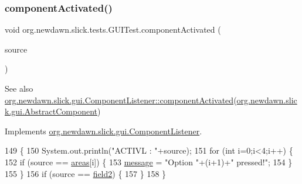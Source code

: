 \subsubsection{\texorpdfstring{component\+Activated()}{componentActivated()}}
{\footnotesize\ttfamily void org.\+newdawn.\+slick.\+tests.\+G\+U\+I\+Test.\+component\+Activated (\begin{DoxyParamCaption}\item[{\mbox{\hyperlink{classorg_1_1newdawn_1_1slick_1_1gui_1_1_abstract_component}{Abstract\+Component}}}]{source }\end{DoxyParamCaption})\hspace{0.3cm}{\ttfamily [inline]}}

\begin{DoxySeeAlso}{See also}
\mbox{\hyperlink{interfaceorg_1_1newdawn_1_1slick_1_1gui_1_1_component_listener_a078740e03974ce07a757744a771e8626}{org.\+newdawn.\+slick.\+gui.\+Component\+Listener\+::component\+Activated}}(\mbox{\hyperlink{classorg_1_1newdawn_1_1slick_1_1gui_1_1_abstract_component}{org.\+newdawn.\+slick.\+gui.\+Abstract\+Component}}) 
\end{DoxySeeAlso}


Implements \mbox{\hyperlink{interfaceorg_1_1newdawn_1_1slick_1_1gui_1_1_component_listener_a078740e03974ce07a757744a771e8626}{org.\+newdawn.\+slick.\+gui.\+Component\+Listener}}.


\begin{DoxyCode}
149                                                              \{
150         System.out.println(\textcolor{stringliteral}{"ACTIVL : "}+source);
151         \textcolor{keywordflow}{for} (\textcolor{keywordtype}{int} i=0;i<4;i++) \{
152             \textcolor{keywordflow}{if} (source == \mbox{\hyperlink{classorg_1_1newdawn_1_1slick_1_1tests_1_1_g_u_i_test_a45e7638907d2d4662aca08ffa006a326}{areas}}[i]) \{
153                 \mbox{\hyperlink{classorg_1_1newdawn_1_1slick_1_1tests_1_1_g_u_i_test_abd20571a152e1beddc3e70a5c3e348a6}{message}} = \textcolor{stringliteral}{"Option "}+(i+1)+\textcolor{stringliteral}{" pressed!"};
154             \}
155         \}
156         \textcolor{keywordflow}{if} (source == \mbox{\hyperlink{classorg_1_1newdawn_1_1slick_1_1tests_1_1_g_u_i_test_a1365fed5962b416d829b81fc02d7d60e}{field2}}) \{
157         \}
158     \}
\end{DoxyCode}
\mbox{\label{classorg_1_1newdawn_1_1slick_1_1tests_1_1_g_u_i_test_a1cc90a27b484cd4f3a050c71a0695b7e}} 

